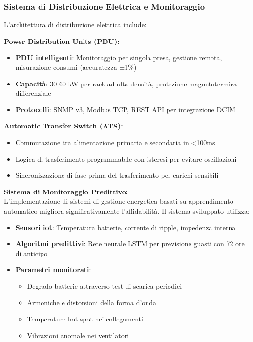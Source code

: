 \subsubsection{\texorpdfstring{Sistema di Distribuzione Elettrica e Monitoraggio}{3.2.1.2 - Sistema di Distribuzione Elettrica e Monitoraggio}}

L'architettura di distribuzione elettrica include:

\textbf{Power Distribution Units (PDU):}
\begin{itemize}
    \item \textbf{PDU intelligenti}: Monitoraggio per singola presa, gestione remota, misurazione consumi (accuratezza ±1\%)
    \item \textbf{Capacità}: 30-60 kW per rack ad alta densità, protezione magnetotermica differenziale
    \item \textbf{Protocolli}: SNMP v3, Modbus TCP, REST API per integrazione DCIM
\end{itemize}

\textbf{Automatic Transfer Switch (ATS):}
\begin{itemize}
    \item Commutazione tra alimentazione primaria e secondaria in <100ms
    \item Logica di trasferimento programmabile con isteresi per evitare oscillazioni
    \item Sincronizzazione di fase prima del trasferimento per carichi sensibili
\end{itemize}

\textbf{Sistema di Monitoraggio Predittivo:}\\
L'implementazione di sistemi di gestione energetica basati su apprendimento automatico migliora significativamente l'affidabilità\autocite{GoogleDeepMind2024}. Il sistema sviluppato utilizza:

\begin{itemize}
    \item \textbf{Sensori \gls{iot}}: Temperatura batterie, corrente di ripple, impedenza interna
    \item \textbf{Algoritmi predittivi}: Rete neurale LSTM per previsione guasti con 72 ore di anticipo
    \item \textbf{Parametri monitorati}: 
    \begin{itemize}
        \item Degrado batterie attraverso test di scarica periodici
        \item Armoniche e distorsioni della forma d'onda
        \item Temperature hot-spot nei collegamenti
        \item Vibrazioni anomale nei ventilatori
    \end{itemize}
\end{itemize}


